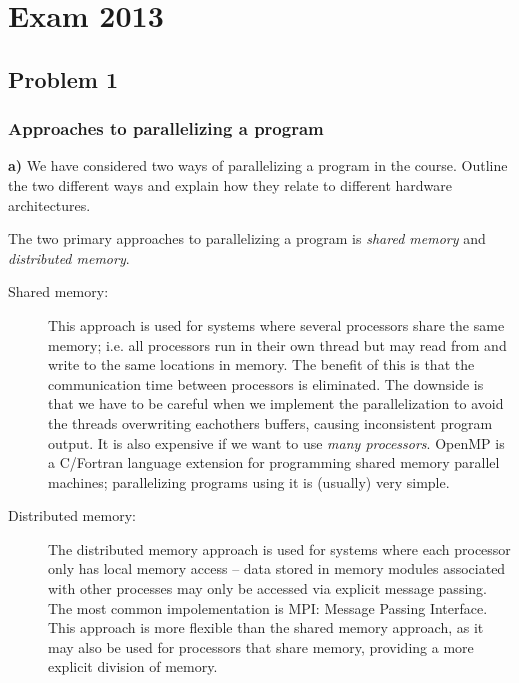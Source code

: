 
\section{Exam 2013} %
\label{sec:exam_2013}
\subsection{Problem 1} %
\label{sub:problem_1}

\subsubsection{Approaches to parallelizing a program} %
\label{ssub:approaches_to_parallelizing_a_program}


\begin{question}
  \textbf{a)} We have considered two ways of parallelizing a program in the course. Outline the two different ways and explain how they relate to different hardware architectures.
\end{question}

The two primary approaches to parallelizing a program is \emph{shared memory} and \emph{distributed memory}.

\begin{description}
  \item[Shared memory:] This approach is used for systems where several processors share the same memory; i.e. all processors run in their own thread but may read from and write to the same locations in memory. The benefit of this is that the communication time between processors is eliminated. The downside is that we have to be careful when we implement the parallelization to avoid the threads overwriting eachothers buffers, causing inconsistent program output. It is also expensive if we want to use \emph{many processors}. OpenMP is a C/Fortran language extension for programming shared memory parallel machines; parallelizing programs using it is (usually) very simple.
  \item[Distributed memory:] The distributed memory approach is used for systems where each processor only has local memory access -- data stored in memory modules associated with other processes may only be accessed via explicit message passing. The most common impolementation is MPI: Message Passing Interface. This approach is more flexible than the shared memory approach, as it may also be used for processors that share memory, providing a more explicit division of memory.
\end{description}

